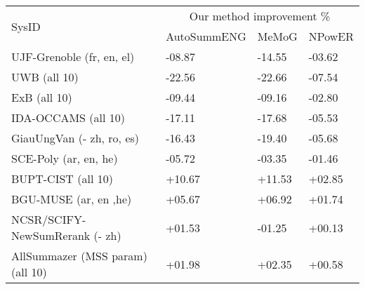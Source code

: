 
\begin{tabular}{p{3.8cm}p{2cm}p{1.2cm}p{1.2cm}} 
\hline \hline
\multirow{2}{*}{SysID} & \multicolumn{3}{c}{Our method improvement \%}\\
\cline{2-4}
					& AutoSummENG 	& MeMoG 	& NPowER \\
\hline
UJF-Grenoble (fr, en, el) 	& -08.87 		& -14.55	& -03.62 \\
UWB (all 10) 		& -22.56 		& -22.66 	& -07.54 \\
ExB (all 10) 		& -09.44 		& -09.16 	& -02.80 \\
IDA-OCCAMS (all 10) 		& -17.11 		& -17.68 	& -05.53 \\
GiauUngVan (- zh, ro, es)	& -16.43		& -19.40	& -05.68 \\
SCE-Poly (ar, en, he)	& -05.72		& -03.35	& -01.46 \\
BUPT-CIST (all 10)		& +10.67		& +11.53	& +02.85 \\
BGU-MUSE (ar, en ,he)	& +05.67		& +06.92	& +01.74 \\
NCSR/SCIFY-NewSumRerank (- zh)		& +01.53		& -01.25	& +00.13 \\
\hline
AllSummazer (MSS param) (all 10)		& +01.98		& +02.35	& +00.58 \\
\hline \hline
\end{tabular}
